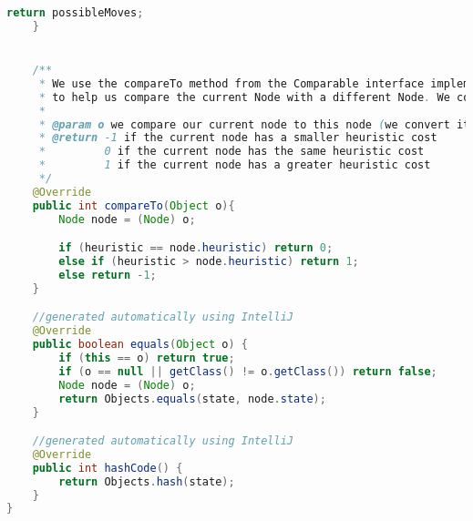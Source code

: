\documentclass[a4paper, 11pt]{article} %
\begin{document}
\begin{lstlisting}[language=java]
        return possibleMoves;
    }


    /**
     * We use the compareTo method from the Comparable interface implemented in the beggining of the class. This is done
     * to help us compare the current Node with a different Node. We compare the nodes in terms of their heuristic cost.
     *
     * @param o we compare our current node to this node (we convert it from Object to Node)
     * @return -1 if the current node has a smaller heuristic cost
     *         0 if the current node has the same heuristic cost
     *         1 if the current node has a greater heuristic cost
     */
    @Override
    public int compareTo(Object o){
        Node node = (Node) o;

        if (heuristic == node.heuristic) return 0;
        else if (heuristic > node.heuristic) return 1;
        else return -1;
    }

    //generated automatically using IntelliJ
    @Override
    public boolean equals(Object o) {
        if (this == o) return true;
        if (o == null || getClass() != o.getClass()) return false;
        Node node = (Node) o;
        return Objects.equals(state, node.state);
    }

    //generated automatically using IntelliJ
    @Override
    public int hashCode() {
        return Objects.hash(state);
    }
}

\end{lstlisting}
\end{document}
